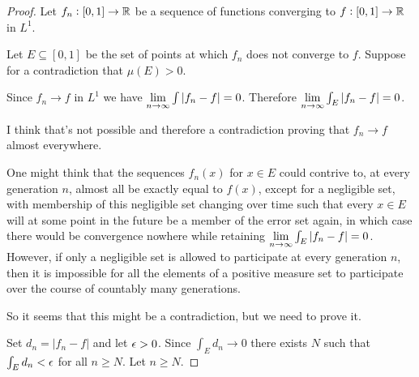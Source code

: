 \begin{proof}
  Let $f_n: [0, 1] \to \mathbb{R}$ be a sequence of functions converging to $f: [0, 1] \to \mathbb{R}$ in $L^1$.

  Let $E \subseteq [0, 1]$ be the set of points at which $f_n$ does not converge to $f$. Suppose for a
  contradiction that $\mu(E) > 0$.

  Since $f_n \to f$ in $L^1$ we have $\limninf \int |f_n - f| = 0$. Therefore $\limninf \int_E |f_n - f| = 0$.

  I think that's not possible and therefore a contradiction proving that $f_n \to f$ almost everywhere.

  One might think that the sequences $f_n(x)$ for $x \in E$ could contrive to, at every generation $n$, almost
  all be exactly equal to $f(x)$, except for a negligible set, with membership of this negligible set changing
  over time such that every $x \in E$ will at some point in the future be a member of the error set again, in
  which case there would be convergence nowhere while retaining $\limninf \int_E |f_n - f| = 0$. However, if
  only a negligible set is allowed to participate at every generation $n$, then it is impossible for all the
  elements of a positive measure set to participate over the course of countably many generations.

  So it seems that this might be a contradiction, but we need to prove it.

  Set $d_n = |f_n - f|$ and let $\epsilon > 0$. Since $\int_E d_n \to 0$ there exists $N$ such
  that $\int_E d_n < \epsilon$ for all $n \geq N$. Let $n \geq N$.
\end{proof}



